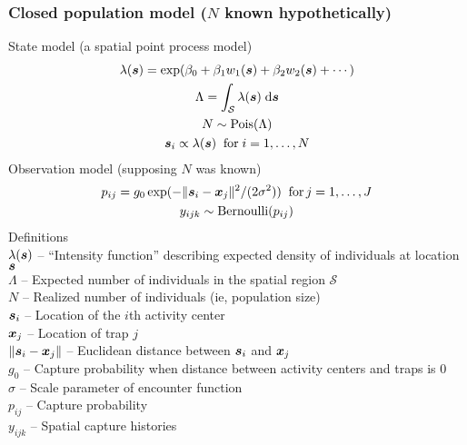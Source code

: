 \documentclass[color=usenames,dvipsnames]{beamer}\usepackage[]{graphicx}\usepackage[]{xcolor}
\begin{document}





\begin{frame}
  \frametitle{\large Closed population model ($N$ known hypothetically) }
  \footnotesize
  State model (a spatial point process model) %
  \begin{gather*}
    \lambda({\bm s}) = \exp(\beta_0 + \beta_1 w_1({\bm s}) + \beta_2 w_2({\bm s}) + \cdots) \\
    \Lambda = \int_{\mathcal{S}} \lambda({\bm s}) \; \mathrm{d}{\bm s} \\
    N \sim \mathrm{Pois}(\Lambda) \\
    {\bm s}_i \propto \lambda({\bm s}) \;\; \mathrm{for}\; i=1,\dots,N 
  \end{gather*}
  \pause
  Observation model (supposing $N$ was known)
  \begin{gather*}
    p_{ij} = g_0\exp(-\|{\bm s}_i - {\bm x}_j\|^2/(2\sigma^2))  \;\; \mathrm{for}\, j=1,\dots,J  \\
    y_{ijk} \sim \mathrm{Bernoulli}(p_{ij})
  \end{gather*}
  \pause
  \scriptsize
  Definitions \\
  \hangindent=0.9cm $\lambda({\bm s})$ -- ``Intensity function'' %
  describing expected density of individuals at location ${\bm s}$ \\ 
  $\Lambda$ -- Expected number of individuals in the spatial region $\mathcal{S}$ \\
  $N$ -- Realized number of individuals (ie, population size) \\
  ${\bm s}_i$ -- Location of the $i$th activity center \\
  ${\bm x}_j$ -- Location of trap $j$ \\
  $\|{\bm s}_i - {\bm x}_j\|$ -- Euclidean distance between ${\bm s}_i$ and ${\bm x}_j$ \\
  $g_0$ -- Capture probability when distance between activity centers
  and traps is 0 \\
  $\sigma$ -- Scale parameter of encounter function \\
  $p_{ij}$ -- Capture probability \\
  $y_{ijk}$ -- Spatial capture histories \\
\end{frame}
\end{document}
